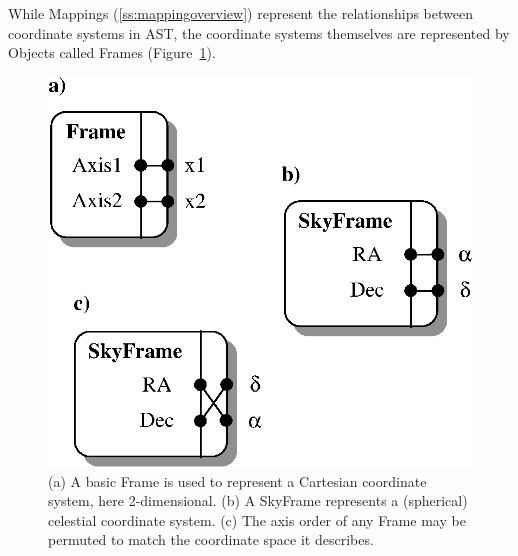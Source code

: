 \documentclass[twoside,11pt]{article}
\newenvironment{latexonly}{}{}
\newcommand{\htmlref}[2]{#1}
\newcommand{\secref}[1]{\S\ref{#1}}
\renewcommand{\secref}[1]{\ref{#1}}
\begin{document}
\begin{latexonly}
   While Mappings (\secref{ss:mappingoverview}) represent the
   relationships between coordinate systems in AST, the coordinate
   systems themselves are represented by Objects called Frames
   (Figure~\ref{fig:frames}).
   \begin{figure}
   \begin{center}
   \includegraphics[scale=0.75]{sun211_figures/frames.eps}
   \caption{(a) A basic \htmlref{Frame}{Frame} is used to represent a Cartesian coordinate
   system, here 2-dimensional. (b) A \htmlref{SkyFrame}{SkyFrame} represents a (spherical)
   celestial coordinate system. (c) The axis order of any Frame may be
   permuted to match the coordinate space it describes.}
   \label{fig:frames}
   \end{center}
   \end{figure}
\end{latexonly}
\end{document}
